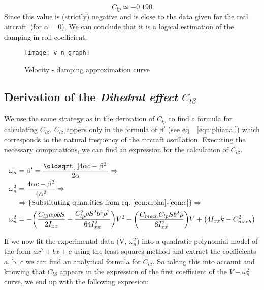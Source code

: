 \begin{equation}
    C_{lp} \simeq -0.190
\end{equation}
Since this value is (strictly) negative and is 
close to the data given for the real aircraft~\cite{database}(for $\alpha = 0$), 
We can conclude that it is a logical estimation of the damping-in-roll coefficient.

\begin{figure}[th]
    \begin{center}
        \texttt{[image: v\_n\_graph]} %
    \end{center}
    \caption{Velocity - damping approximation curve}
    \label{fig:v_n_graph}
\end{figure}



\subsection{Derivation of the \textit{Dihedral effect} $C_{l\beta}$}

We use the same strategy as in the derivation of $C_{lp}$ to find a formula for 
calculating $C_{l\beta}$. $C_{l\beta}$ appers only in the formula of $\beta'$ (see eq. ~\ref{eqn:phianal})
which corresponds to the natural frequency of the aircraft oscillation. Executing the 
necessary computations, we can find an expression for the calculation of $C_{l\beta}$.

\begin{align}
    \omega_n &= \beta' = \frac{\sqrt{4\alpha c - \beta^2}}{2\alpha} \Rightarrow \notag\\
    \omega_n^2 &= \frac{4\alpha c - \beta^2}{4\alpha^2} \Rightarrow \notag\\
    &\Rightarrow \{\textrm{Substituting quantities from eq.~\ref{eqn:alpha}-\ref{eqn:c}} \}\Rightarrow \notag\\
    \omega_n^2 &= -\bigg(\frac{C_{l\beta}\alpha \rho bS}{2I_{xx}} + \frac{C_{lp}^2\rho S^2 b^4 \rho^2}{64I_{xx}^2}\bigg)V^2
    + \bigg(\frac{C_{mech}C_{lp}Sb^2\rho}{8I_{xx}^2}\bigg)V
    + \big(4I_{xx}k - C_{mech}^2\big) \label{eqn:wn2_V}
\end{align}

If we now fit the experimental data (V, $\omega_n^2$) into a quadratic polynomial model of the form 
$ax^2 + bx + c$ using the least squares method and extract the 
coefficients a, b, c we can find an analytical formula for $C_{l\beta}$.
So taking this into account and knowing that $C_{l\beta}$ appears in the expression
of the first coefficient of the $V-\omega_n^2$ curve, we end up with the following expresion:

